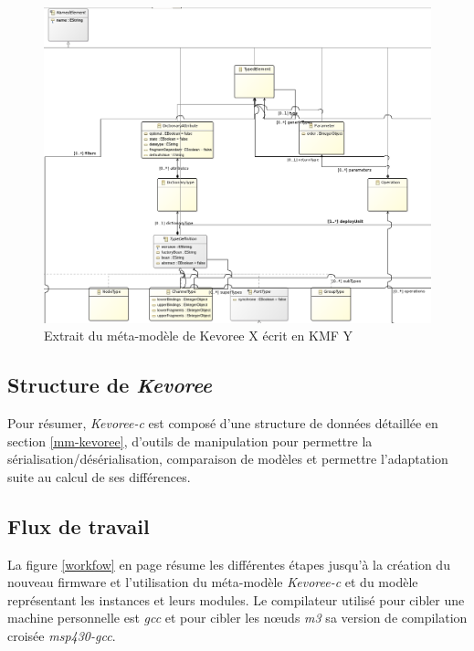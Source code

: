 \begin{figure}[ht!]
\centering
\includegraphics[scale=0.4]{images/kevoree-cd.png}
\caption{Extrait du méta-modèle de Kevoree X écrit en KMF Y}
\label{kevoree-cd}
\end{figure}

\subsection{Structure de \emph{Kevoree}}

Pour résumer, \emph{Kevoree-c} est composé d'une structure de données détaillée en section \ref{mm-kevoree}, d'outils de manipulation pour permettre la sérialisation/désérialisation, comparaison de modèles et permettre l'adaptation suite au calcul de ses différences.

\subsection{Flux de travail}

La figure \ref{workfow} en page \pageref{workfow} résume les différentes étapes jusqu'à la création du nouveau firmware et l'utilisation du méta-modèle \emph{Kevoree-c} et du modèle représentant les instances et leurs modules. Le compilateur utilisé pour cibler une machine personnelle est \emph{gcc} et pour cibler les nœuds \emph{m3} sa version de compilation croisée \emph{msp430-gcc}.

